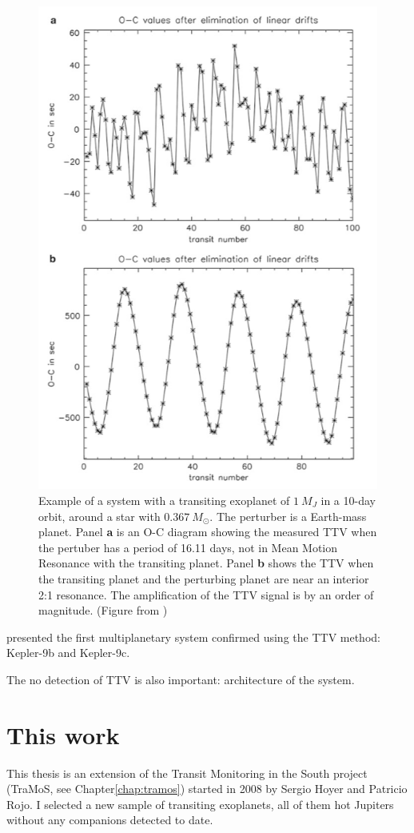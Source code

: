 \begin{figure}
\centering
\includegraphics[width=0.6\columnwidth]{imagenes/rms_ttv_amplitude}
\caption{Example of a system with a transiting exoplanet of $1~M_{J}$ in a 10-day orbit, around a star with $0.367~M_{\odot}$. The perturber is a Earth-mass planet. Panel \textbf{a} is an O-C diagram showing the measured TTV when the pertuber has a period of 16.11 days, not in Mean Motion Resonance with the transiting planet. Panel \textbf{b} shows the TTV when the transiting planet and the perturbing planet are near an interior 2:1 resonance. The amplification of the TTV signal is by an order of magnitude. (Figure from \cite{Haghighipour2011})}
\label{rms_ttv_amplitude}
\end{figure}

\cite{Holman2010} presented the first multiplanetary system confirmed using the TTV method: Kepler-9b and Kepler-9c. 

The no detection of TTV is also important: architecture of the system.








\section{This work}

This thesis is an extension of the Transit Monitoring in the South project (TraMoS, see Chapter\ref{chap:tramos}) started in 2008 by Sergio Hoyer and Patricio Rojo. I selected a new sample of transiting exoplanets, all of them hot Jupiters without any companions detected to date.  